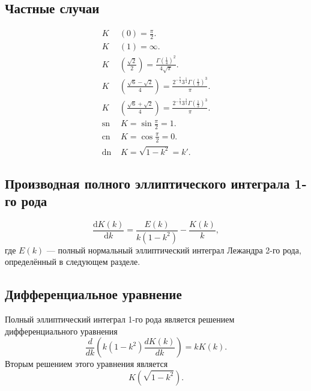\documentclass[fleqn]{article}
\newcommand{\sn}{\mathrm{sn}\,}
\newcommand{\cn}{\mathrm{cn}\,}
\newcommand{\dn}{\mathrm{dn}\,}
\begin{document}
	\subsection{Частные случаи}
	\begin{align*}
		K&(0)=\frac{\pi}{2}.\\
		K&(1)=\infty. \\
		K&\left({\frac {\sqrt {2}}{2}}\right)={\frac {\Gamma \left({\frac {1}{4}}\right)^{2}}{4{\sqrt {\pi }}}}. \\
		K&\left({\frac {{\sqrt {6}}-{\sqrt {2}}}{4}}\right)={\frac {2^{-{\frac {7}{3}}}3^{\frac {1}{4}}\Gamma \left({\frac {1}{3}}\right)^{3}}{\pi }}. \\ 
		K&\left({\frac {{\sqrt {6}}+{\sqrt {2}}}{4}}\right)={\frac {2^{-{\frac {7}{3}}}3^{\frac {3}{4}}\Gamma \left({\frac {1}{3}}\right)^{3}}{\pi }}. \\
		\sn& \,K=\sin {\frac {\pi }{2}}=1. \\
		\cn& \,K=\cos {\frac {\pi }{2}}=0. \\
		\dn& \,K={\sqrt {1-k^{2}}}=k'.
	\end{align*}
	\subsection{Производная полного эллиптического интеграла 1-го рода}
	\begin{equation*}{\frac {\mathrm {d} K(k)}{\mathrm {d} k}}={\frac {E(k)}{k(1-k^{2})}}-{\frac {K(k)}{k}},\end{equation*}
	где $E(k)$ --- полный нормальный эллиптический интеграл Лежандра 2-го рода, определённый в следующем разделе.
	\subsection{Дифференциальное уравнение}
	Полный эллиптический интеграл 1-го рода является решением дифференциального уравнения
	\begin{equation*}{\frac {d}{dk}}\left(k\left(1-k^{2}\right){\frac {dK(k)}{dk}}\right)=kK(k).\end{equation*}
	Вторым решением этого уравнения является
	\begin{equation*}K\left(\sqrt{1-k^2}\right).\end{equation*}
\end{document}
